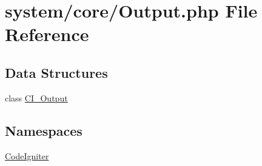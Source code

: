 \hypertarget{_output_8php}{}\section{system/core/\+Output.php File Reference}
\label{_output_8php}
\subsection*{Data Structures}
\begin{DoxyCompactItemize}
\item 
class \mbox{\hyperlink{class_c_i___output}{C\+I\+\_\+\+Output}}
\end{DoxyCompactItemize}
\subsection*{Namespaces}
\begin{DoxyCompactItemize}
\item 
 \mbox{\hyperlink{namespace_code_igniter}{Code\+Igniter}}
\end{DoxyCompactItemize}
